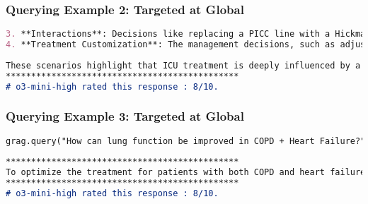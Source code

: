 \begin{frame}[fragile]\frametitle{Querying Example 2: Targeted at Global}
    \begin{lstlisting}[language=markdown]
3. **Interactions**: Decisions like replacing a PICC line with a Hickman catheter after infection shows proactive steps in avoiding repeat complications due to prior infections from central lines.
4. **Treatment Customization**: The management decisions, such as adjusting insulin administration for endocrine challenges even when insulin levels are normal, demonstrate personalized ICU therapy adapting for nuanced metabolic control in conditions like hypoglycemia of unknown origin.
    
These scenarios highlight that ICU treatment is deeply influenced by a patient's demographic specifics \ldots and chronic health issues effectively.
**********************************************
# o3-mini-high rated this response : 8/10.	
    \end{lstlisting}

\end{frame}


\begin{frame}[fragile]\frametitle{Querying Example 3: Targeted at Global}
        \begin{lstlisting}[language=markdown]
    grag.query("How can lung function be improved in COPD + Heart Failure?").response
	
**********************************************
To optimize the treatment for patients with both COPD and heart failure, it is crucial to manage fluids carefully using diuretics without causing respiratory issues. This necessitates precise adjustments in medication dosages, closely monitoring fluid balance, and ensuring proper oxygenation levels. Right heart catheterization can assist in measuring cardiac function and tailoring treatments for these patients. The goal is to alleviate symptoms of both conditions while preventing exacerbations, which often involves using supplemental oxygen or bronchodilators as required.
**********************************************
# o3-mini-high rated this response : 8/10.	
    \end{lstlisting}

\end{frame}

